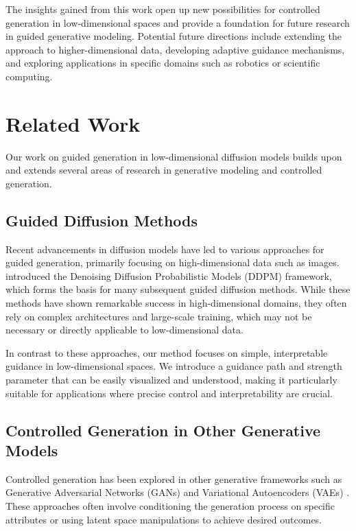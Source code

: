 \documentclass{article} %
\begin{document}
The insights gained from this work open up new possibilities for controlled generation in low-dimensional spaces and provide a foundation for future research in guided generative modeling. Potential future directions include extending the approach to higher-dimensional data, developing adaptive guidance mechanisms, and exploring applications in specific domains such as robotics or scientific computing.

\section{Related Work}
\label{sec:related}

Our work on guided generation in low-dimensional diffusion models builds upon and extends several areas of research in generative modeling and controlled generation.

\subsection{Guided Diffusion Methods}

Recent advancements in diffusion models have led to various approaches for guided generation, primarily focusing on high-dimensional data such as images. \citet{ddpm} introduced the Denoising Diffusion Probabilistic Models (DDPM) framework, which forms the basis for many subsequent guided diffusion methods. While these methods have shown remarkable success in high-dimensional domains, they often rely on complex architectures and large-scale training, which may not be necessary or directly applicable to low-dimensional data.

In contrast to these approaches, our method focuses on simple, interpretable guidance in low-dimensional spaces. We introduce a guidance path and strength parameter that can be easily visualized and understood, making it particularly suitable for applications where precise control and interpretability are crucial.

\subsection{Controlled Generation in Other Generative Models}

Controlled generation has been explored in other generative frameworks such as Generative Adversarial Networks (GANs) \cite{gan} and Variational Autoencoders (VAEs) \cite{vae}. These approaches often involve conditioning the generation process on specific attributes or using latent space manipulations to achieve desired outcomes.
\end{document}

